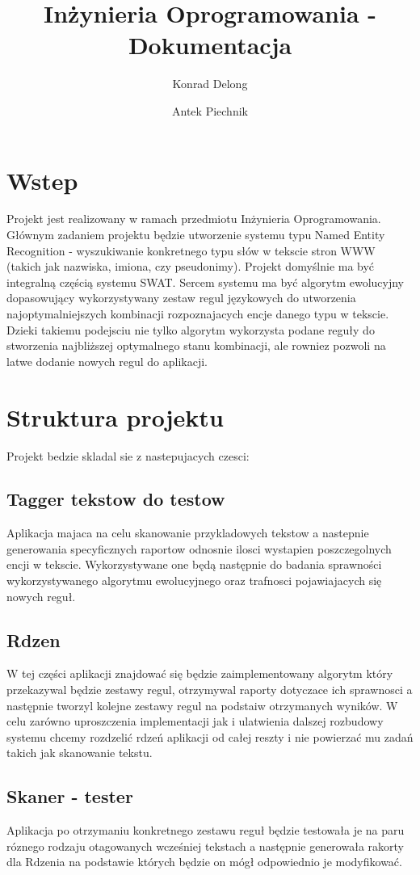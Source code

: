 \documentclass[12pt]{article}
\author{Konrad Delong \and Antek Piechnik}
\title{Inżynieria Oprogramowania - Dokumentacja}
\begin{document}
\maketitle
\tableofcontents
\newpage

\section{Wstep}
Projekt jest realizowany w ramach przedmiotu Inżynieria Oprogramowania. Głównym zadaniem projektu będzie utworzenie systemu typu Named Entity Recognition - wyszukiwanie konkretnego typu słów w tekscie stron WWW (takich jak nazwiska, imiona, czy pseudonimy). Projekt domyślnie ma być integralną częścią systemu SWAT. Sercem systemu ma być algorytm ewolucyjny dopasowujący wykorzystywany zestaw regul językowych do utworzenia najoptymalniejszych kombinacji rozpoznajacych encje danego typu w tekscie. Dzieki takiemu podejsciu nie tylko algorytm wykorzysta podane reguły do stworzenia najbliższej optymalnego stanu kombinacji, ale rowniez pozwoli na latwe dodanie nowych regul do aplikacji.
\section{Struktura projektu}
Projekt bedzie skladal sie z nastepujacych czesci:
\subsection{Tagger tekstow do testow}
Aplikacja majaca na celu skanowanie przykladowych tekstow a nastepnie generowania specyficznych raportow odnosnie ilosci wystapien poszczegolnych encji w tekscie. Wykorzystywane one będą następnie do badania sprawności wykorzystywanego algorytmu ewolucyjnego oraz trafnosci pojawiajacych się nowych reguł.
\subsection{Rdzen}
W tej części aplikacji znajdować się będzie zaimplementowany algorytm który przekazywal będzie zestawy regul, otrzymywal raporty dotyczace ich sprawnosci a następnie tworzyl kolejne zestawy regul na podstaiw otrzymanych wyników. W celu zarówno uproszczenia implementacji jak i ulatwienia dalszej rozbudowy systemu chcemy rozdzelić rdzeń aplikacji od całej reszty i nie powierzać mu zadań takich jak skanowanie tekstu.
\subsection{Skaner - tester}
Aplikacja po otrzymaniu konkretnego zestawu reguł będzie testowała je na paru róznego rodzaju otagowanych wcześniej tekstach a następnie generowała rakorty dla Rdzenia na podstawie których będzie on mógł odpowiednio je modyfikować.
\end{document}
